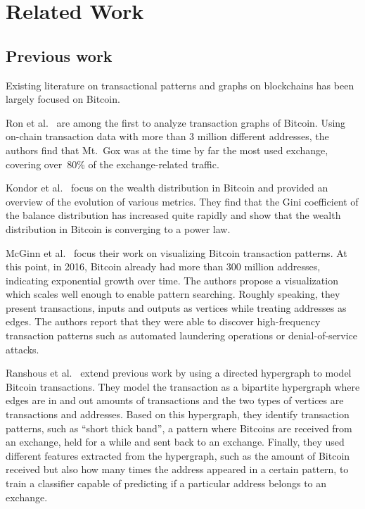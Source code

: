 \section{Related Work}
\label{sec:4:related}

\subsection{Previous work}
Existing literature on transactional patterns and graphs on blockchains has been largely focused on Bitcoin.

Ron et al.~\cite{10.1007/978-3-642-39884-1_2} are among the first to analyze transaction graphs of Bitcoin. Using on-chain transaction data with more than 3 million different addresses, the authors find that Mt.~Gox was at the time by far the most used exchange, covering over~80\% of the exchange-related traffic.

Kondor et al.~\cite{10.1371/journal.pone.0086197} focus on the wealth distribution in Bitcoin and provided an overview of the evolution of various metrics. They find that the Gini coefficient of the balance distribution has increased quite rapidly and show that the wealth distribution in Bitcoin is converging to a power law.

McGinn et al.~\cite{mcginn2016visualizing} focus their work on visualizing Bitcoin transaction patterns. At this point, in 2016, Bitcoin already had more than 300 million addresses, indicating exponential growth over time. The authors propose a visualization which scales well enough to enable pattern searching. Roughly speaking, they present transactions, inputs and outputs as vertices while treating addresses as edges. The authors report that they were able to discover high-frequency transaction patterns such as automated laundering operations or denial-of-service attacks.

Ranshous et al.~\cite{10.1007/978-3-319-70278-0_16} extend previous work by using a directed hypergraph to model Bitcoin transactions. They model the transaction as a bipartite hypergraph where edges are in and out amounts of transactions and the two types of vertices are transactions and addresses. Based on this hypergraph, they identify transaction patterns, such as ``short thick band'', a pattern where Bitcoins are received from an exchange, held for a while and sent back to an exchange. Finally, they used different features extracted from the hypergraph, such as the amount of Bitcoin received but also how many times the address appeared in a certain pattern, to train a classifier capable of predicting if a particular address belongs to an exchange.

